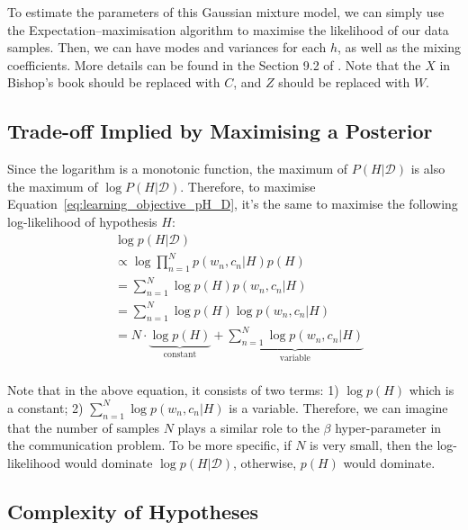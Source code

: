 \documentclass[11pt]{article}
\begin{document}
To estimate the parameters of this Gaussian mixture model, we can simply use the Expectation–maximisation algorithm\citep{EM} to maximise the likelihood of our data samples.
Then, we can have modes and variances for each $h$, as well as the mixing coefficients. 
More details can be found in the Section 9.2 of \citep{bishop2006pattern}.
Note that the $X$ in Bishop's book should be replaced with $C$, and $Z$ should be replaced with $W$.

\subsection{Trade-off Implied by Maximising a Posterior}
\label{ssec:learn_tradeoff}

Since the logarithm is a monotonic function, the maximum of $P(H|\mathcal{D})$ is also the maximum of $\log P(H|\mathcal{D})$. 
Therefore, to maximise Equation~\ref{eq:learning_objective_pH_D}, it's the same to maximise the following log-likelihood of hypothesis $H$:
\begin{align*}
        & \log p(H|\mathcal{D}) \\
        & \propto \log \prod_{n=1}^{N} p(w_n, c_n|H)p(H) \\
        &  =\sum_{n=1}^{N} \log p(H) p(w_n, c_n|H) \\
        &  =\sum_{n=1}^{N} \log p(H) \log p(w_n, c_n|H) \\
        &  =N\cdot\underbrace{\log p(H)}_{\text{constant}} + \underbrace{\sum_{n=1}^{N} \log p(w_n, c_n|H)}_{\text{variable}} \\
    \label{eq:learning_objective_log_pH_D}
\end{align*}

Note that in the above equation, it consists of two terms: 1) $\log p(H)$ which is a constant; 2) $\sum_{n=1}^{N} \log p(w_n, c_n|H)$ is a variable.
Therefore, we can imagine that the number of samples $N$ plays a similar role to the $\beta$ hyper-parameter in the communication problem. 
To be more specific, if $N$ is very small, then the log-likelihood would dominate $\log p(H|\mathcal{D})$, otherwise, $p(H)$ would dominate.

\subsection{Complexity of Hypotheses}
\label{ssec:learn_complexity}
\end{document}

